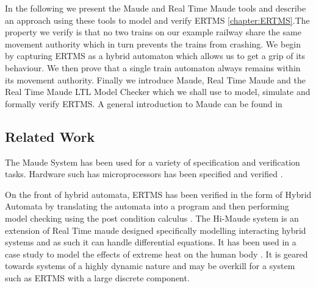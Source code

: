 \newcommand{\rtmaude}{Real Time Maude}

In the following we present the Maude \cite{MC03,Maude} and Real Time Maude \cite{PO02,PO04,RTMaude} tools and describe an approach using these tools to model and verify ERTMS \ref{chapter:ERTMS}.The property we verify is that no two trains on our example railway share the same movement authority which in turn prevents the trains from crashing. We begin by capturing ERTMS as a hybrid automaton which allows us to get a grip of its behaviour. We then prove that a single train automaton always remains within its movement authority. Finally we introduce Maude, Real Time Maude and the Real Time Maude LTL Model Checker which we shall use to model, simulate and formally verify ERTMS. A general introduction to Maude can be found in \cite{MaudeBook}

\subsection*{Related Work}
The Maude System has been used for a variety of specification and verification tasks. Hardware such has microprocessors has been specified and verified \cite{NH00}. 

On the front of hybrid automata, ERTMS has been verified in the form of Hybrid Automata by translating the automata into a program and then performing model checking using the post condition calculus \cite{DI13}. The Hi-Maude system \cite{MF11} is an extension of Real Time maude designed specifically modelling interacting hybrid systems and as such it can handle differential equations. It has been used in a case study to model the effects of extreme heat on the human body \cite{MF12}. It is geared towards systems of a highly dynamic nature and may be overkill for a system such as ERTMS with a large discrete component.


